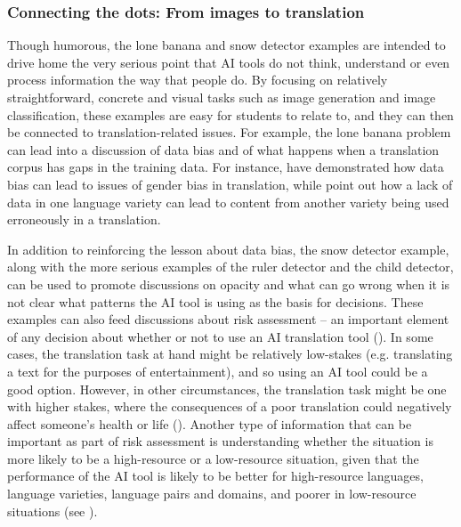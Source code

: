 \documentclass[output=paper]{langscibook}
\begin{document}
\subsubsection{Connecting the dots: From images to translation}\label{sec:4:4.3.4}
Though humorous, the lone banana and snow detector examples are intended to drive home the very serious point that AI tools do not think, understand or even process information the way that people do. By focusing on relatively straightforward, concrete and visual tasks such as image generation and image classification, these examples are easy for students to relate to, and they can then be connected to translation-related issues. For example, the lone banana problem can lead into a discussion of data bias and of what happens when a translation corpus has gaps in the training data. For instance, \citet{vanmassenhovehw18} have demonstrated how data bias can lead to issues of gender bias in translation, while \citet{bowkerblain22} point out how a lack of data in one language variety can lead to content from another variety being used erroneously in a translation. 

In addition to reinforcing the lesson about data bias, the snow detector example, along with the more serious examples of the ruler detector and the child detector, can be used to promote discussions on opacity and what can go wrong when it is not clear what patterns the AI tool is using as the basis for decisions. These examples can also feed discussions about risk assessment – an important element of any decision about whether or not to use an AI translation tool (\citealt{koponennurminen24}). In some cases, the translation task at hand might be relatively low-stakes (e.g. translating a text for the purposes of entertainment), and so using an AI tool could be a good option. However, in other circumstances, the translation task might be one with higher stakes, where the consequences of a poor translation could negatively affect someone’s health or life (\citealt{way2013}). Another type of information that can be important as part of risk assessment is understanding whether the situation is more likely to be a high-resource or a low-resource situation, given that the performance of the AI tool is likely to be better for high-resource languages, language varieties, language pairs and domains, and poorer in low-resource situations (see ).
\end{document}
